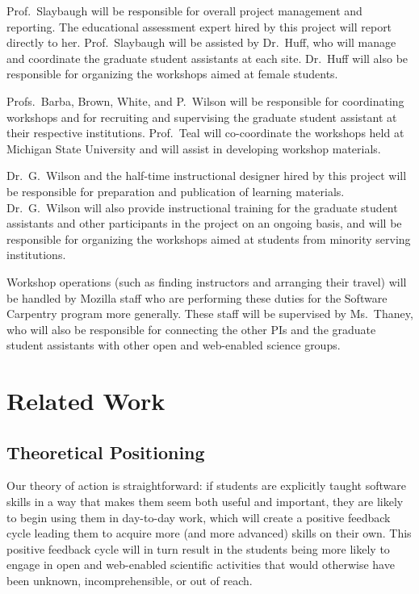 \documentclass{proposalnsf}
\newlength{\up}
\begin{document}
Prof.\ Slaybaugh will be responsible for overall project management
and reporting.  The educational assessment expert hired by this
project will report directly to her.  Prof.\ Slaybaugh will be
assisted by Dr.\ Huff, who will manage and coordinate the graduate
student assistants at each site.  Dr.\ Huff will also be responsible
for organizing the workshops aimed at female students.

Profs.\ Barba, Brown, White, and P.\ Wilson will be responsible for
coordinating workshops and for recruiting and supervising the graduate
student assistant at their respective institutions. Prof.\ Teal will co-coordinate the workshops held at Michigan State University and will assist in developing workshop materials.

Dr.\ G.\ Wilson and the half-time instructional designer hired by this
project will be responsible for preparation and publication of
learning materials.  Dr.\ G.\ Wilson will also provide instructional
training for the graduate student assistants and other participants in
the project on an ongoing basis, and will be responsible for
organizing the workshops aimed at students from minority serving institutions.

Workshop operations (such as finding instructors and arranging their
travel) will be handled by Mozilla staff who are performing these
duties for the Software Carpentry program more generally.  These staff
will be supervised by Ms.\ Thaney, who will also be responsible for
connecting the other PIs and the graduate student assistants with
other open and web-enabled science groups.

\section{Related Work}

\subsection{Theoretical Positioning}

Our theory of action is straightforward: if students are explicitly
taught software skills in a way that makes them seem both useful and
important, they are likely to begin using them in day-to-day work,
which will create a positive feedback cycle leading them to acquire
more (and more advanced) skills on their own. This positive feedback
cycle will in turn result in the students being more likely to engage
in open and web-enabled scientific activities that would otherwise
have been unknown, incomprehensible, or out of reach.
\end{document}
